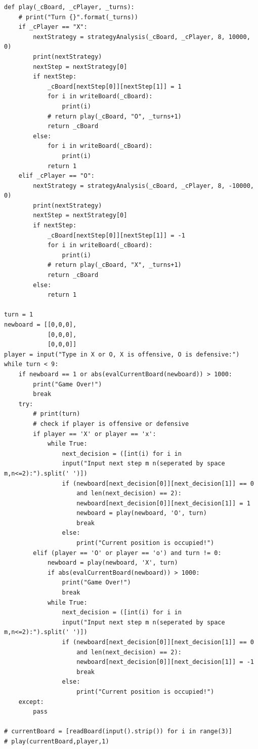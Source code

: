 \documentclass[a4paper]{scrartcl}
\begin{document}
\begin{verbatim}
def play(_cBoard, _cPlayer, _turns):
    # print("Turn {}".format(_turns))
    if _cPlayer == "X":
        nextStrategy = strategyAnalysis(_cBoard, _cPlayer, 8, 10000, 0)
        print(nextStrategy)
        nextStep = nextStrategy[0]
        if nextStep:
            _cBoard[nextStep[0]][nextStep[1]] = 1
            for i in writeBoard(_cBoard):
                print(i)
            # return play(_cBoard, "O", _turns+1)
            return _cBoard
        else:
            for i in writeBoard(_cBoard):
                print(i)
            return 1
    elif _cPlayer == "O":
        nextStrategy = strategyAnalysis(_cBoard, _cPlayer, 8, -10000, 0)
        print(nextStrategy)
        nextStep = nextStrategy[0]
        if nextStep:
            _cBoard[nextStep[0]][nextStep[1]] = -1
            for i in writeBoard(_cBoard):
                print(i)
            # return play(_cBoard, "X", _turns+1)
            return _cBoard
        else:
            return 1

turn = 1
newboard = [[0,0,0],
            [0,0,0],
            [0,0,0]]
player = input("Type in X or O, X is offensive, O is defensive:")
while turn < 9:
    if newboard == 1 or abs(evalCurrentBoard(newboard)) > 1000:
        print("Game Over!")
        break
    try:
        # print(turn)
        # check if player is offensive or defensive
        if player == 'X' or player == 'x':
            while True:
                next_decision = ([int(i) for i in 
                input("Input next step m n(seperated by space m,n<=2):").split(' ')])
                if (newboard[next_decision[0]][next_decision[1]] == 0 
                    and len(next_decision) == 2):
                    newboard[next_decision[0]][next_decision[1]] = 1
                    newboard = play(newboard, 'O', turn)
                    break
                else:
                    print("Current position is occupied!")
        elif (player == 'O' or player == 'o') and turn != 0:
            newboard = play(newboard, 'X', turn)
            if abs(evalCurrentBoard(newboard)) > 1000:
                print("Game Over!")
                break
            while True:
                next_decision = ([int(i) for i in 
                input("Input next step m n(seperated by space m,n<=2):").split(' ')])
                if (newboard[next_decision[0]][next_decision[1]] == 0 
                    and len(next_decision) == 2):
                    newboard[next_decision[0]][next_decision[1]] = -1
                    break
                else:
                    print("Current position is occupied!")
    except:
        pass

# currentBoard = [readBoard(input().strip()) for i in range(3)]
# play(currentBoard,player,1)
\end{verbatim}
\end{document}
